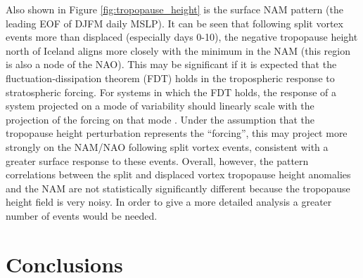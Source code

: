 Also shown in Figure \ref{fig:tropopause_height} is the surface NAM pattern (the
leading EOF of DJFM daily MSLP). It can be seen that following split vortex
events more than displaced (especially days 0-10), the negative tropopause
height north of Iceland aligns more closely with the minimum in the NAM (this
region is also a node of the NAO). This may be significant if it is expected
that the fluctuation-dissipation theorem (FDT) holds in the tropospheric
response to stratospheric forcing. For systems in which the FDT holds, the
response of a system projected on a mode of variability should linearly scale
with the projection of the forcing on that mode \citep{Ring2008}. Under the
assumption that the tropopause height perturbation represents the ``forcing'',
this may project more strongly on the NAM/NAO following split vortex events,
consistent with a greater surface response to these events. Overall, however,
the pattern correlations between the split and displaced vortex tropopause
height anomalies and the NAM are not statistically significantly different
because the tropopause height field is very noisy. In order to give a more
detailed analysis a greater number of events would be needed.


 


\section{Conclusions}

